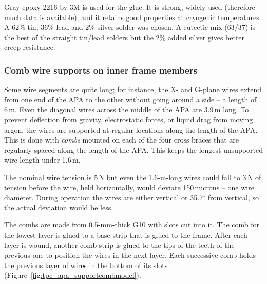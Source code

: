 Gray epoxy 2216 by 3M is used for the glue.  It is strong, widely used (therefore much data is available), and it retains good properties at cryogenic temperatures.  A 62$\%$ tin, 36$\%$ lead and 2$\%$ silver solder was chosen.  A eutectic mix (63/37) is the best of the straight tin/lead solders but the 2$\%$ added silver gives better creep resistance.

\subsubsection{Comb wire supports on inner frame members}
\label{subsec:apa_combs}


Some wire segments are quite long; for instance, the X- and G-plane wires 
extend from one end of the APA to the other without going around a side -- a length of 6\,m.  Even the diagonal wires across the middle of the APA are 3.9\,m long.  To prevent deflection from gravity, electrostatic forces, or liquid drag from moving argon, the wires are supported at regular locations along the length of the APA.  This is done with \textit{combs} mounted on each of the four cross braces that are  %
regularly spaced along the length of the APA.  This keeps the longest unsupported wire length under 1.6\,m.

The nominal wire tension is 5\,N but even the 1.6-m-long wires could fall to 3\,N of tension before the wire, held horizontally, would deviate 150\,microns -- one wire diameter.  During operation the wires are either vertical or 35.7$^{\circ}$ from vertical, so the actual deviation would be less.


The combs are made from 0.5-mm-thick G10 with slots cut into it.  The comb for the lowest layer is glued to a base strip that is glued to the frame.  After each layer is wound, another comb strip is glued to the tips of the teeth of the previous one to position the wires in the next layer.  Each successive comb holds the previous layer of wires in the bottom of its slots (Figure~\ref{fig:tpc_apa_supportcombmodel}).


